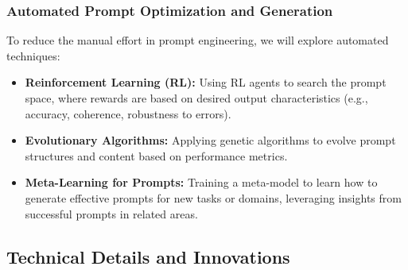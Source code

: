 \documentclass{article}
\begin{document}
\subsubsection{Automated Prompt Optimization and Generation}
To reduce the manual effort in prompt engineering, we will explore automated techniques:
\begin{itemize}
    \item \textbf{Reinforcement Learning (RL):} Using RL agents to search the prompt space, where rewards are based on desired output characteristics (e.g., accuracy, coherence, robustness to errors).
    \item \textbf{Evolutionary Algorithms:} Applying genetic algorithms to evolve prompt structures and content based on performance metrics.
    \item \textbf{Meta-Learning for Prompts:} Training a meta-model to learn how to generate effective prompts for new tasks or domains, leveraging insights from successful prompts in related areas.
\end{itemize}

\subsection{Technical Details and Innovations}
\end{document}
